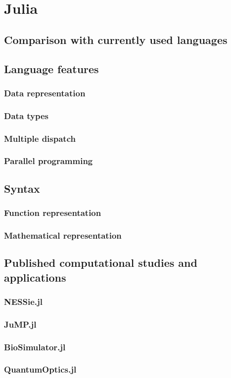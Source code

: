 \section{Julia}

\subsection{Comparison with currently used languages}
\subsection{Language features}
\subsubsection{Data representation}
\subsubsection{Data types}
\subsubsection{Multiple dispatch}
\subsubsection{Parallel programming}
\subsection{Syntax}
\subsubsection{Function representation}
\subsubsection{Mathematical representation}
\subsection{Published computational studies and applications}
\subsubsection{NESSie.jl}
\subsubsection{JuMP.jl}
\subsubsection{BioSimulator.jl}
\subsubsection{QuantumOptics.jl}

